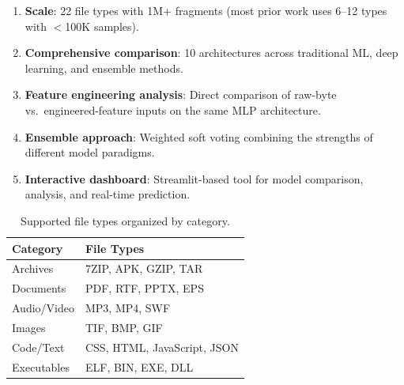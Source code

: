 \documentclass[12pt,a4paper]{report}
\begin{document}
\begin{normalsize}
{\begin{enumerate}[noitemsep]
    \item \textbf{Scale}: 22 file types with 1M+ fragments (most prior work uses 6--12 types with $<$100K samples).
    \item \textbf{Comprehensive comparison}: 10 architectures across traditional ML, deep learning, and ensemble methods.
    \item \textbf{Feature engineering analysis}: Direct comparison of raw-byte vs.\ engineered-feature inputs on the same MLP architecture.
    \item \textbf{Ensemble approach}: Weighted soft voting combining the strengths of different model paradigms.
    \item \textbf{Interactive dashboard}: Streamlit-based tool for model comparison, analysis, and real-time prediction.
\end{enumerate}

\begin{table}[H]
\centering
\caption{Supported file types organized by category.}
\label{tab:file_types}
\begin{tabular}{ll}
\toprule
\textbf{Category} & \textbf{File Types} \\
\midrule
Archives      & 7ZIP, APK, GZIP, TAR \\
Documents     & PDF, RTF, PPTX, EPS \\
Audio/Video   & MP3, MP4, SWF \\
Images        & TIF, BMP, GIF \\
Code/Text     & CSS, HTML, JavaScript, JSON \\
Executables   & ELF, BIN, EXE, DLL \\
\bottomrule
\end{tabular}
\end{table}
\par}

\end{normalsize}

\newpage
\end{document}
